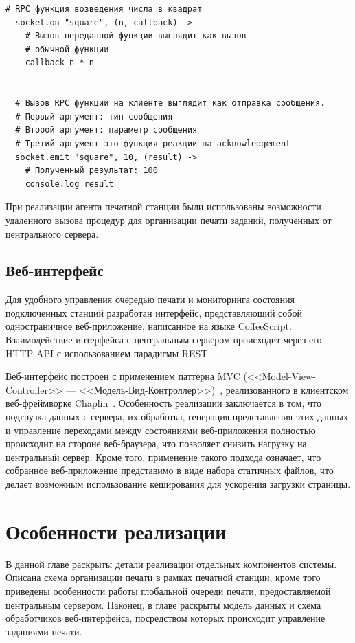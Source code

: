 \documentclass[a4paper,14pt,href,draft]{article}
\begin{document}
\begin{lstlisting}[caption=Удаленный вызов процедур в socket.io, label=lst:rpc]
  # RPC функция возведения числа в квадрат
  socket.on "square", (n, callback) ->
    # Вызов переданной функции выглядит как вызов
    # обычной функции
    callback n * n


  # Вызов RPC функции на клиенте выглядит как отправка сообщения.
  # Первый аргумент: тип сообщения
  # Второй аргумент: параметр сообщения
  # Третий аргумент это функция реакции на acknowledgement
  socket.emit "square", 10, (result) ->
    # Полученный результат: 100
    console.log result
\end{lstlisting}

При реализации агента печатной станции были использованы возможности удаленного вызова процедур для организации печати
заданий, полученных от центрального сервера.

\subsection{Веб-интерфейс}
Для удобного управления очередью печати и мониторинга состояния подключенных станций разработан интерфейс, представляющий
собой одностраничное веб-приложение, написанное на языке CoffeeScript. Взаимодействие интерфейса с центральным
 сервером происходит через его HTTP API с использованием парадигмы REST.

Веб-интерфейс построен с применением паттерна MVC (<<Model-View-Controller>> --- <<Модель-Вид-Контроллер>>)~\cite{ScalingIsomorphic},
реализо\-ван\-но\-го в клиентском веб-фреймворке Chaplin~\cite{ChaplinJS}. Особенность реализации заключается в том, что
подгрузка данных с сервера, их обработка, генерация представления этих данных и управление переходами между состояниями
веб-приложения полностью происходит на стороне веб-браузера, что позволяет снизить нагрузку на центральный сервер.
Кроме того, применение такого подхода означает, что собранное веб-приложение представимо в виде набора статичных файлов,
что делает возможным использование кеширования для ускорения загрузки страницы.

\newpage
\section{Особенности реализации}
В данной главе раскрыты детали реализации отдельных компонентов системы. Описана схема организации печати в рамках
печатной станции, кроме того приведены особенности работы глобальной очереди печати, предоставляемой центральным сервером.
Наконец, в главе раскрыты модель данных и схема обработчиков веб-интерфейса, посредством которых происходит управление заданиями
печати.
\end{document}
